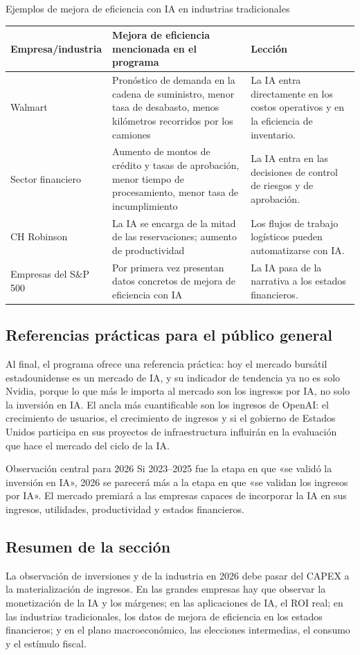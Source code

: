 \begin{knowledgebox}{Ejemplos de mejora de eficiencia con IA en industrias tradicionales}
\begin{tabularx}{\textwidth}{p{}p{}X}
\toprule
Empresa/industria & Mejora de eficiencia mencionada en el programa & Lección \\
\midrule
Walmart & Pronóstico de demanda en la cadena de suministro, menor tasa de desabasto, menos kilómetros recorridos por los camiones & La IA entra directamente en los costos operativos y en la eficiencia de inventario. \\
Sector financiero & Aumento de montos de crédito y tasas de aprobación, menor tiempo de procesamiento, menor tasa de incumplimiento & La IA entra en las decisiones de control de riesgos y de aprobación. \\
CH Robinson & La IA se encarga de la mitad de las reservaciones; aumento de productividad & Los flujos de trabajo logísticos pueden automatizarse con IA. \\
Empresas del S\&P 500 & Por primera vez presentan datos concretos de mejora de eficiencia con IA & La IA pasa de la narrativa a los estados financieros. \\
\bottomrule
\end{tabularx}
\end{knowledgebox}

\subsection{Referencias prácticas para el público general}

Al final, el programa ofrece una referencia práctica: hoy el mercado bursátil estadounidense es un mercado de IA, y su indicador de tendencia ya no es solo Nvidia, porque lo que más le importa al mercado son los ingresos por IA, no solo la inversión en IA. El ancla más cuantificable son los ingresos de OpenAI: el crecimiento de usuarios, el crecimiento de ingresos y si el gobierno de Estados Unidos participa en sus proyectos de infraestructura influirán en la evaluación que hace el mercado del ciclo de la IA.

\begin{importantbox}{Observación central para 2026}
Si 2023--2025 fue la etapa en que «se validó la inversión en IA», 2026 se parecerá más a la etapa en que «se validan los ingresos por IA». El mercado premiará a las empresas capaces de incorporar la IA en sus ingresos, utilidades, productividad y estados financieros.
\end{importantbox}

\subsection{Resumen de la sección}

La observación de inversiones y de la industria en 2026 debe pasar del CAPEX a la materialización de ingresos. En las grandes empresas hay que observar la monetización de la IA y los márgenes; en las aplicaciones de IA, el ROI real; en las industrias tradicionales, los datos de mejora de eficiencia en los estados financieros; y en el plano macroeconómico, las elecciones intermedias, el consumo y el estímulo fiscal.
